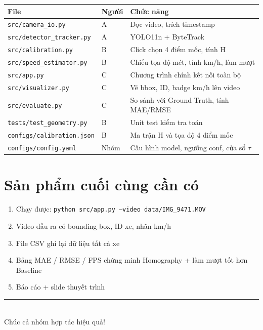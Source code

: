 \documentclass[11pt,a4paper]{article}
\begin{document}
\begin{table}[H]
\centering\small
\begin{tabularx}{\textwidth}{@{}llX@{}}
\toprule
\textbf{File} & \textbf{Người} & \textbf{Chức năng}\\
\midrule
\texttt{src/camera\_io.py} & A & Đọc video, trích timestamp\\
\texttt{src/detector\_tracker.py} & A & YOLO11n + ByteTrack\\
\texttt{src/calibration.py} & B & Click chọn 4 điểm mốc, tính H\\
\texttt{src/speed\_estimator.py} & B & Chiếu tọa độ mét, tính km/h, làm mượt\\
\texttt{src/app.py} & C & Chương trình chính kết nối toàn bộ\\
\texttt{src/visualizer.py} & C & Vẽ bbox, ID, badge km/h lên video\\
\texttt{src/evaluate.py} & C & So sánh với Ground Truth, tính MAE/RMSE\\
\texttt{tests/test\_geometry.py} & B & Unit test kiểm tra toán\\
\texttt{configs/calibration.json} & B & Ma trận H và tọa độ 4 điểm mốc\\
\texttt{configs/config.yaml} & Nhóm & Cấu hình model, ngưỡng conf, cửa sổ $\tau$\\
\bottomrule
\end{tabularx}
\end{table}

\section{Sản phẩm cuối cùng cần có}

\begin{enumerate}
    \item Chạy được: \texttt{python src/app.py --video data/IMG\_9471.MOV}
    \item Video đầu ra có bounding box, ID xe, nhãn km/h
    \item File CSV ghi lại dữ liệu tất cả xe
    \item Bảng MAE / RMSE / FPS chứng minh Homography + làm mượt tốt hơn Baseline
    \item Báo cáo + slide thuyết trình
\end{enumerate}

\vspace{0.5cm}
\begin{center}
    \rule{0.5\textwidth}{0.5pt}\\[4pt]
    {\sffamily\small\color{darkgray} Chúc cả nhóm hợp tác hiệu quả!}
\end{center}
\end{document}

